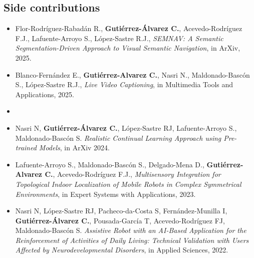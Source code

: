 \subsection{Side contributions}\label{subsec:side-contributions}

\begin{itemize}
    \item Flor-Rodríguez-Rabadán R., \textbf{Gutiérrez-Álvarez C.}, Acevedo-Rodríguez F.J., Lafuente-Arroyo S., López-Sastre R.J., \textit{SEMNAV: A Semantic Segmentation-Driven Approach to Visual Semantic Navigation}, in ArXiv, 2025.
    \item Blanco-Fernández E., \textbf{Gutiérrez-Alvarez C.}, Nasri N., Maldonado-Bascón S., López-Sastre R.J., \textit{Live Video Captioning}, in Multimedia Tools and Applications, 2025.
    \item \item Nasri N, \textbf{Gutiérrez-Álvarez C.}, López-Sastre RJ, Lafuente-Arroyo S., Maldonado-Bascón S. \textit{Realistic Continual Learning Approach using Pre-trained Models}, in ArXiv 2024.
    \item Lafuente-Arroyo S., Maldonado-Bascón S., Delgado-Mena D., \textbf{Gutiérrez-Alvarez C.}, Acevedo-Rodríguez F.J., \textit{Multisensory Integration for Topological Indoor Localization of Mobile Robots in Complex Symmetrical Environments}, in Expert Systems with Applications, 2023.
    \item Nasri N, López-Sastre RJ, Pacheco-da-Costa S, Fernández-Munilla I, \textbf{Gutiérrez-Álvarez C.}, Pousada-García T, Acevedo-Rodríguez FJ, Maldonado-Bascón S. \textit{Assistive Robot with an AI-Based Application for the Reinforcement of Activities of Daily Living: Technical Validation with Users Affected by Neurodevelopmental Disorders}, in Applied Sciences, 2022.
\end{itemize}